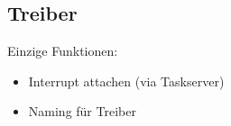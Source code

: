 \subsection{Treiber}



Einzige Funktionen:

\begin{itemize}
	\item Interrupt attachen (via Taskserver)
	\item Naming für Treiber
\end{itemize}